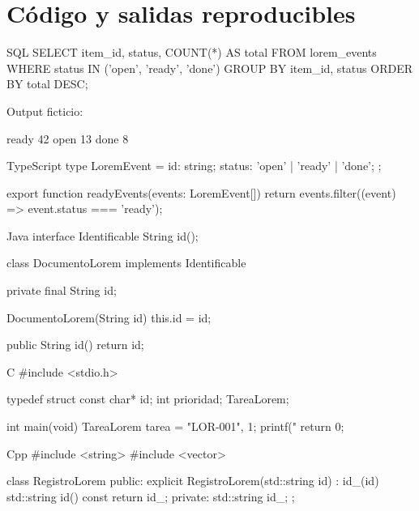 \documentclass{claudeeditorial}
\begin{document}
\section{Código y salidas reproducibles}

\begin{ClaudeCode}[title={Consulta SQL lorem}]{SQL}
SELECT
  item_id,
  status,
  COUNT(*) AS total
FROM lorem_events
WHERE status IN ('open', 'ready', 'done')
GROUP BY item_id, status
ORDER BY total DESC;
\end{ClaudeCode}

\begin{ClaudeOutput}
Output ficticio:

ready  42
open   13
done    8
\end{ClaudeOutput}

\begin{ClaudeCode}[title={Servicio TypeScript}]{TypeScript}
type LoremEvent = {
  id: string;
  status: 'open' | 'ready' | 'done';
};

export function readyEvents(events: LoremEvent[]) {
  return events.filter((event) => event.status === 'ready');
}
\end{ClaudeCode}

\begin{ClaudeCode}[title={Clase Java ficticia}]{Java}
interface Identificable {
    String id();
}

class DocumentoLorem implements Identificable {
    private final String id;

    DocumentoLorem(String id) {
        this.id = id;
    }

    public String id() {
        return id;
    }
}
\end{ClaudeCode}

\begin{ClaudeCode}[title={Modelo C}]{C}
#include <stdio.h>

typedef struct {
    const char* id;
    int prioridad;
} TareaLorem;

int main(void) {
    TareaLorem tarea = {"LOR-001", 1};
    printf("%
    return 0;
}
\end{ClaudeCode}

\begin{ClaudeCode}[title={Modelo C++}]{Cpp}
#include <string>
#include <vector>

class RegistroLorem {
public:
    explicit RegistroLorem(std::string id) : id_(id) {}
    std::string id() const { return id_; }
private:
    std::string id_;
};
\end{ClaudeCode}
\end{document}
